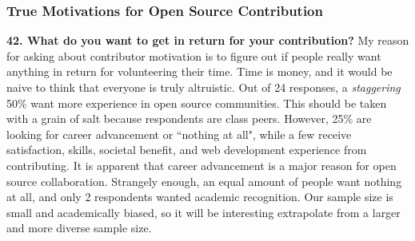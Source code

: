 \subsubsection{True Motivations for Open Source Contribution}
{\bf 42. What do you want to get in return for your contribution?} My reason for asking about contributor motivation is to figure out if people really want anything in return for volunteering their time. Time is money, and it would be naive to think that everyone is truly altruistic. Out of 24 responses, a {\it staggering} 50\% want more experience in open source communities. This should be taken with a grain of salt because respondents are class peers. However, 25\% are looking for career advancement or ``nothing at all", while a few receive satisfaction, skills, societal benefit, and web development experience from contributing. It is apparent that career advancement is a major reason for open source collaboration. Strangely enough, an equal amount of people want nothing at all, and only 2 respondents wanted academic recognition. Our sample size is small and academically biased, so it will be interesting extrapolate from a larger and more diverse sample size.
